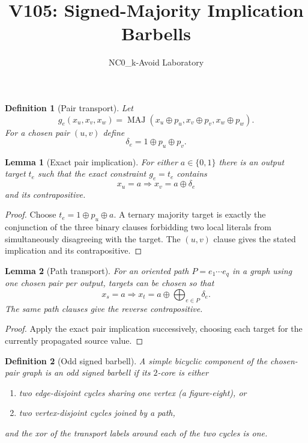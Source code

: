 \documentclass[11pt]{article}
\title{V105: Signed-Majority Implication Barbells}
\author{NC0\_k-Avoid Laboratory}
\date{}
\newtheorem{lemma}{Lemma}
\newtheorem{definition}{Definition}
\begin{document}
\maketitle

\begin{definition}[Pair transport]
Let
\[
 g_e(x_u,x_v,x_w)=\operatorname{MAJ}(x_u\oplus p_u,
 x_v\oplus p_v,x_w\oplus p_w).
\]
For a chosen pair $(u,v)$ define
\[
 \delta_e=1\oplus p_u\oplus p_v.
\]
\end{definition}

\begin{lemma}[Exact pair implication]
For either $a\in\{0,1\}$ there is an output target $t_e$ such that the exact
constraint $g_e=t_e$ contains
\[
 x_u=a\Longrightarrow x_v=a\oplus\delta_e
\]
and its contrapositive.
\end{lemma}
\begin{proof}
Choose $t_e=1\oplus p_u\oplus a$.  A ternary majority target is exactly the
conjunction of the three binary clauses forbidding two local literals from
simultaneously disagreeing with the target.  The $(u,v)$ clause gives the stated
implication and its contrapositive.
\end{proof}

\begin{lemma}[Path transport]
For an oriented path $P=e_1\cdots e_q$ in a graph using one chosen pair per
output, targets can be chosen so that
\[
 x_s=a\Longrightarrow x_t=a\oplus\bigoplus_{e\in P}\delta_e.
\]
The same path clauses give the reverse contrapositive.
\end{lemma}
\begin{proof}
Apply the exact pair implication successively, choosing each target for the
currently propagated source value.
\end{proof}

\begin{definition}[Odd signed barbell]
A simple bicyclic component of the chosen-pair graph is an \emph{odd signed
barbell} if its $2$-core is either
\begin{enumerate}
\item two edge-disjoint cycles sharing one vertex (a figure-eight), or
\item two vertex-disjoint cycles joined by a path,
\end{enumerate}
and the xor of the transport labels around each of the two cycles is one.
\end{definition}
\end{document}
